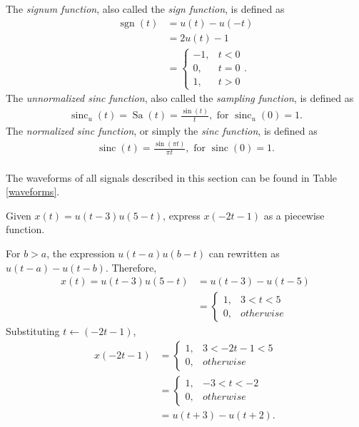 \documentclass{report}
\begin{document}
The \emph{signum function}, also called the \emph{sign function}, is defined as 
\begin{align}
    \operatorname{sgn}(t) &= u(t)-u(-t) \\ 
    &= 2u(t)-1 \\
    &=
    \begin{cases} 
        -1, & t<0 \\
        0, & t=0 \\
        1, & t>0
    \end{cases}.
\end{align}
The \emph{unnormalized sinc function}, also called the \emph{sampling function}, is defined as 
\begin{align}
    \operatorname{sinc}_u(t) = \operatorname{Sa}(t)=\frac{\sin(t)}{t}, \text{ for } \operatorname{sinc}_u(0) = 1.
\end{align}
The \emph{normalized sinc function}, or simply the \emph{sinc function}, is defined as 
\begin{align}
    \operatorname{sinc}(t) = \frac{\sin(\pi t)}{\pi t}, \text{ for } \operatorname{sinc}(0) = 1.
\end{align} \\
The waveforms of all signals described in this section can be found in Table \ref{waveforms}. 
\begin{example}
    Given $x(t)=u(t-3)u(5-t)$, express $x(-2t-1)$ as a piecewise function.
\end{example}
\begin{solution}
    For $b>a$, the expression $u(t-a)u(b-t)$ can rewritten as $u(t-a)-u(t-b)$. Therefore,
    \begin{align*}
        x(t) = u(t-3)u(5-t) &= u(t-3) - u(t-5) \\
        &= \begin{cases}
            1, & 3 < t < 5 \\
            0, & otherwise
        \end{cases}
    \end{align*}
    Substituting $t\leftarrow (-2t-1)$,
    \begin{align*}
        x(-2t-1) &= \begin{cases}
            1, & 3 < -2t-1 < 5 \\
            0, & otherwise
        \end{cases} \\
        &= \begin{cases}
            1, & -3 < t < -2 \\
            0, & otherwise
        \end{cases} \\
        &= u(t+3)-u(t+2).
    \end{align*}
\end{solution}
\end{document}
